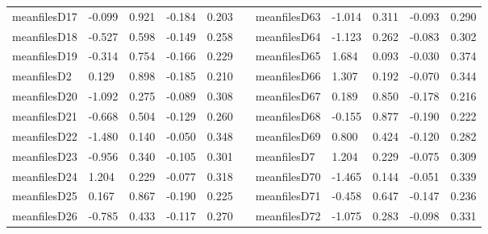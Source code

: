 \begin{table}[h!]
\begin{tabular}{lllllllllll}
meanfilesD17  & -0.099           & 0.921            & -0.184              & 0.203               &           & meanfilesD63  & -1.014           & 0.311            & -0.093              & 0.290               \\
meanfilesD18  & -0.527           & 0.598            & -0.149              & 0.258               &           & meanfilesD64  & -1.123           & 0.262            & -0.083              & 0.302               \\
meanfilesD19  & -0.314           & 0.754            & -0.166              & 0.229               &           & meanfilesD65  & 1.684            & 0.093            & -0.030              & 0.374               \\
meanfilesD2   & 0.129            & 0.898            & -0.185              & 0.210               &           & meanfilesD66  & 1.307            & 0.192            & -0.070              & 0.344               \\
meanfilesD20  & -1.092           & 0.275            & -0.089              & 0.308               &           & meanfilesD67  & 0.189            & 0.850            & -0.178              & 0.216               \\
meanfilesD21  & -0.668           & 0.504            & -0.129              & 0.260               &           & meanfilesD68  & -0.155           & 0.877            & -0.190              & 0.222               \\
meanfilesD22  & -1.480           & 0.140            & -0.050              & 0.348               &           & meanfilesD69  & 0.800            & 0.424            & -0.120              & 0.282               \\
meanfilesD23  & -0.956           & 0.340            & -0.105              & 0.301               &           & meanfilesD7   & 1.204            & 0.229            & -0.075              & 0.309               \\
meanfilesD24  & 1.204            & 0.229            & -0.077              & 0.318               &           & meanfilesD70  & -1.465           & 0.144            & -0.051              & 0.339               \\
meanfilesD25  & 0.167            & 0.867            & -0.190              & 0.225               &           & meanfilesD71  & -0.458           & 0.647            & -0.147              & 0.236               \\
meanfilesD26  & -0.785           & 0.433            & -0.117              & 0.270               &           & meanfilesD72  & -1.075           & 0.283            & -0.098              & 0.331               \\

\end{tabular}
\end{table}
